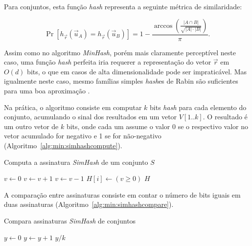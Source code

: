 Para conjuntos, esta função \emph{hash} representa a seguinte métrica de similaridade:

\[
    \Pr[h_{\vec{r}}(\vec{u}_A) = h_{\vec{r}}(\vec{u}_B)] = 1 - \frac{\arccos \left( \frac{|A \cap B|}{\sqrt{|A| \cdot |B|}}\right)}{\pi}\text{.}
\]

Assim como no algoritmo \emph{MinHash}, porém mais claramente perceptível neste caso, uma função \emph{hash} perfeita iria requerer a representação do vetor $\vec{r}$ em $O(d)$ bits, o que em casos de alta dimensionalidade pode ser impraticável. Mas igualmente neste caso, mesmo famílias simples \emph{hash}es de Rabin são suficientes para uma boa aproximação \cite{charikar2002similarity}.

Na prática, o algoritmo consiste em computar $k$ bits \emph{hash} para cada elemento do conjunto, acumulando o sinal dos resultados em um vetor $V[1..k]$. O resultado é um outro vetor de $k$ bits, onde cada um assume o valor 0 se o respectivo valor no vetor acumulado for negativo e 1 se for não-negativo (Algoritmo~\ref{alg:min:simhashcompute}).

\begin{algorithm}
\linespread{1}\selectfont
\caption{Computa a assinatura \emph{SimHash} de um conjunto $S$}
\label{alg:min:simhashcompute}
\begin{algorithmic}[1]
        \State $v \gets 0$
                \State $v \gets v + 1$
            \Else
                \State $v \gets v - 1$
            \EndIf
	    \EndFor
        \State $H[i] \gets (v \geq 0)$
	\EndFor
	\Return $H$
\EndFunction
\end{algorithmic}
\end{algorithm}

A comparação entre assinaturas consiste em contar o número de bits iguais em duas assinaturas (Algoritmo~\ref{alg:min:simhashcompare}).

\begin{algorithm}
\linespread{1}\selectfont
\caption{Compara assinaturas \emph{SimHash} de conjuntos}
\label{alg:min:simhashcompare}
\begin{algorithmic}[1]
    \State $y \gets 0$
            \State $y \gets y + 1$
        \EndIf
	\EndFor
	\Return $y/k$
\EndFunction
\end{algorithmic}
\end{algorithm}

